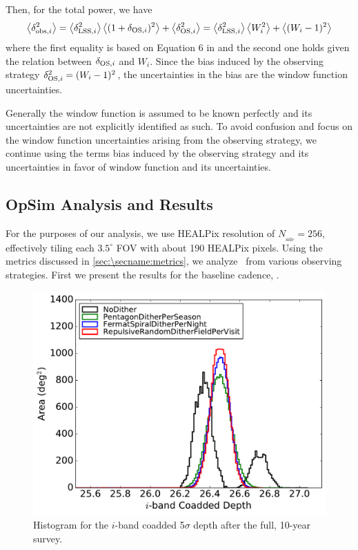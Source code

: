 Then, for the total power, we have
\begin{equation}
\left < {\delta_{\mathrm{obs},i}^2} \right >=\left < {\delta_{\mathrm{LSS},i}^2} \right >\left < {(1 + \delta_{\mathrm{OS},i})^2} \right >+ \left < {\delta_{\mathrm{OS},i}^2} \right >=\left < {\delta_{\mathrm{LSS},i}^2} \right >\left < {W_i^2} \right >+ \left < {(W_i-1)^2} \right >
\end{equation}
where the first equality is based on Equation 6 in \citet{AwanEtal2016} and the second one holds given the relation between $\delta_{\mathrm{OS},i}$ and $W_i$. Since the bias induced by the observing strategy $\delta_{\mathrm{OS},i}^2=  (W_i-1)^2$, the uncertainties in the bias are the window function uncertainties.

Generally the window function is assumed to be known perfectly and its uncertainties are not explicitly identified as such. To avoid confusion and focus on the window function uncertainties arising from the observing strategy, we continue using the terms bias induced by the observing strategy and its uncertainties in favor of window function and its uncertainties.

\subsection{OpSim Analysis and Results}
\label{sec:\secname: analysis}
For the purposes of our analysis, we use HEALPix resolution of $N_\mathrm{_{side}}= 256$, effectively tiling each $3.5^\circ$ FOV with about 190 HEALPix pixels. Using the metrics discussed in \autoref{sec:\secname:metrics}, we analyze \sigmaOS\ from various observing strategies. First we present the results for the baseline cadence, .

\begin{figure}[!htb]
      \centering\hspace*{-3em}\includegraphics[width=0.6\linewidth]{figs/awan_coaddHistogram.pdf}
      \vspace*{-1em}
\caption{Histogram for the $i$-band coadded 5$\sigma$ depth after the full, 10-year survey.}
\label{fig: coaddHistogram}
\end{figure}

